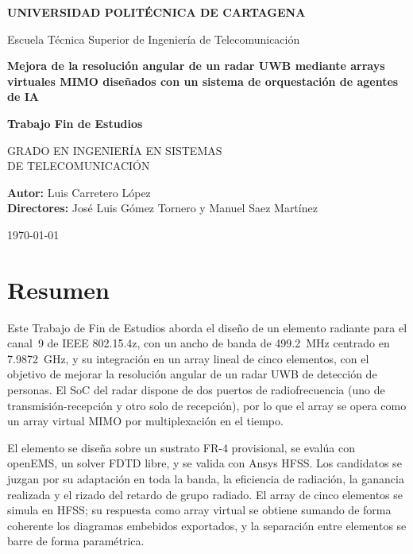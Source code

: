 \documentclass[11pt,a4paper]{article}
\begin{document}
\begin{titlepage}

    \AddToShipoutPicture*{\BackgroundPic}


    \centering
    \vspace*{0cm}
    \Huge{\textbf{UNIVERSIDAD POLITÉCNICA DE CARTAGENA}}

    \vspace{0.5cm}
    \Huge{Escuela Técnica Superior de Ingeniería de Telecomunicación}

    \vspace{2cm}
    \LARGE{\textbf{Mejora de la resolución angular de un radar UWB mediante arrays virtuales MIMO diseñados con un sistema de orquestación de agentes de IA}}

    \vspace{2cm}
    \LARGE{\textbf{Trabajo Fin de Estudios}}

    \vspace{0.3cm}
    \Large{GRADO EN INGENIERÍA EN SISTEMAS \\ 
    DE TELECOMUNICACIÓN}

    \vfill
    \large{\textbf{Autor:}} Luis Carretero López \\
    \vspace{0.2cm}
    \large{\textbf{Directores:}} José Luis Gómez Tornero y Manuel Saez Martínez 

    \vspace{1cm}
    \large{\today}
\end{titlepage}


\newpage
\section*{Resumen}
Este Trabajo de Fin de Estudios aborda el diseño de un elemento radiante para el canal~9 de
IEEE 802.15.4z, con un ancho de banda de \SI{499.2}{MHz} centrado en \SI{7.9872}{GHz}, y su
integración en un array lineal de cinco elementos, con el objetivo de mejorar la resolución
angular de un radar UWB de detección de personas. El SoC del radar dispone de dos puertos de radiofrecuencia (uno de
transmisión-recepción y otro solo de recepción), por lo que el array se opera como un array virtual MIMO por multiplexación
en el tiempo.

El elemento se diseña sobre un sustrato FR-4 provisional, se evalúa con openEMS, un solver FDTD
libre, y se valida con Ansys HFSS. Los candidatos se juzgan por su adaptación en toda la banda,
la eficiencia de radiación, la ganancia realizada y el rizado del retardo de grupo radiado. El
array de cinco elementos se simula en HFSS; su respuesta como array virtual se obtiene sumando de
forma coherente los diagramas embebidos exportados, y la separación entre elementos se barre de
forma paramétrica.
\end{document}
